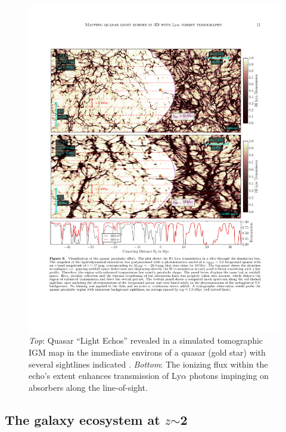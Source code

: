 \begin{figure}[h!]
%
\vskip -0.1in
%
\includegraphics[width=\textwidth]{figs/qso_LightEcho_v1.pdf}
%
\caption{{\it Top}: Quasar ``Light Echos'' revealed in a simulated tomographic IGM map in the immediate environs of a quasar (gold star) with several sightlines indicated \citep[from][]{2018arXiv181005156S}.  {\it Bottom}: The ionizing flux within the echo's extent enhances transmission of Ly$\alpha$ photons impinging on absorbers along the line-of-sight.}
%
\label{fig:LightEcho}
%
\end{figure}


\subsection{The galaxy ecosystem at $z$$\sim$2}
\label{sec:z2galaxies}

